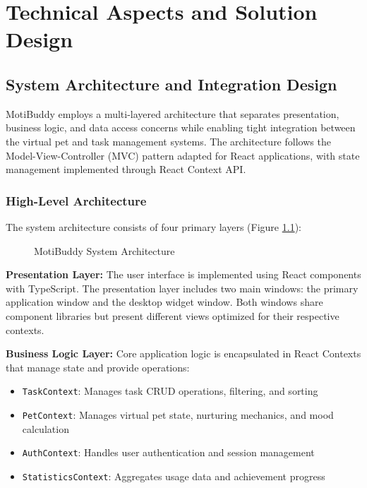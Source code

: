 
\chapter{Technical Aspects and Solution Design}
\label{chap:technical-design}

\section{System Architecture and Integration Design}
\label{sec:system-architecture}

\completed

MotiBuddy employs a multi-layered architecture that separates presentation, business logic, and data access concerns while enabling tight integration between the virtual pet and task management systems. The architecture follows the Model-View-Controller (MVC) pattern adapted for React applications, with state management implemented through React Context API.

\subsection{High-Level Architecture}

The system architecture consists of four primary layers (Figure \ref{fig:architecture}):

\begin{figure}[htbp]
    \centering
    \caption{MotiBuddy System Architecture}
    \label{fig:architecture}
\end{figure}

\textbf{Presentation Layer:} The user interface is implemented using React components with TypeScript. The presentation layer includes two main windows: the primary application window and the desktop widget window. Both windows share component libraries but present different views optimized for their respective contexts.

\textbf{Business Logic Layer:} Core application logic is encapsulated in React Contexts that manage state and provide operations:
\begin{itemize}
    \item \texttt{TaskContext}: Manages task CRUD operations, filtering, and sorting
    \item \texttt{PetContext}: Manages virtual pet state, nurturing mechanics, and mood calculation
    \item \texttt{AuthContext}: Handles user authentication and session management
    \item \texttt{StatisticsContext}: Aggregates usage data and achievement progress
\end{itemize}

